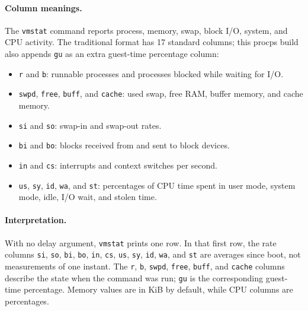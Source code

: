 
\paragraph{Column meanings.}
The \texttt{vmstat} command reports process, memory, swap, block I/O, system,
and CPU activity. The traditional format has 17 standard columns; this procps
build also appends \texttt{gu} as an extra guest-time percentage column:

\begin{itemize}[leftmargin=*]
    \item \texttt{r} and \texttt{b}: runnable processes and processes blocked while waiting for I/O.
    \item \texttt{swpd}, \texttt{free}, \texttt{buff}, and \texttt{cache}: used swap, free RAM, buffer memory, and cache memory.
    \item \texttt{si} and \texttt{so}: swap-in and swap-out rates.
    \item \texttt{bi} and \texttt{bo}: blocks received from and sent to block devices.
    \item \texttt{in} and \texttt{cs}: interrupts and context switches per second.
    \item \texttt{us}, \texttt{sy}, \texttt{id}, \texttt{wa}, and \texttt{st}: percentages of CPU time spent in user mode, system mode, idle, I/O wait, and stolen time.
\end{itemize}

\paragraph{Interpretation.}
With no delay argument, \texttt{vmstat} prints one row. In that first row, the
rate columns \texttt{si}, \texttt{so}, \texttt{bi}, \texttt{bo}, \texttt{in},
\texttt{cs}, \texttt{us}, \texttt{sy}, \texttt{id}, \texttt{wa}, and
\texttt{st} are averages since boot, not measurements of one instant. The
\texttt{r}, \texttt{b}, \texttt{swpd}, \texttt{free}, \texttt{buff}, and
\texttt{cache} columns describe the state when the command was run; \texttt{gu}
is the corresponding guest-time percentage. Memory values are in KiB by
default, while CPU columns are percentages.
